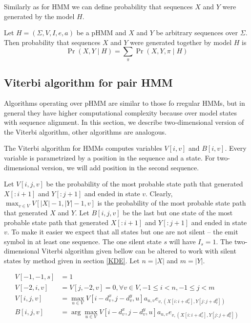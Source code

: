 Similarly as for HMM we can define probability that sequences $X$ and $Y$ were
generated by the model $H$.

\begin{definition}
Let $H=(\Sigma,V,I,e,a)$ be a pHMM and  $X$ and $Y$ be arbitrary sequences over
$\Sigma$. Then probability that sequences $X$ and $Y$ were generated together by
model $H$ is 
\begin{equation}
\Pr\left(X,Y\mid H\right)=\sum_{\pi}\Pr\left(X,Y,\pi\mid H\right)
\end{equation}
\end{definition}


\subsection{Viterbi algorithm for pair HMM}

Algorithms operating over  pHMM are similar to those fo rregular HMMs, but in
general they have higher computational complexity because over model states with
sequence alignment.
In this section, we describe two-dimensional version of the Viterbi algorithm,
other algorithms are analogous.

The Viterbi algorithm for HMMs computes variables $V[i,v]$ and $B[i,v]$. Every
variable is parametrized by a position in the sequence and a state. For
two-dimensional version, we will add position in the second sequence.

Let $V[i,j,v]$ be the probability of the most probable state path that generated
$X[:i+1]$ and $Y[:j+1]$ and ended in state $v$. Clearly, $\max_{v\in
V}V[|X|-1,|Y|-1,v]$ is the probability of the most probable state path that
generated $X$ and $Y$. Let $B[i,j,v]$ be the last but one state of the most
probable state path that generated $X[:i+1]$ and $Y[:j+1]$ and ended in state
$v$. To make it easier we expect that all states but one are not silent -- the emit
symbol in at least one sequence. The one silent state $s$ will have $I_s=1$.
The two-dimensional Viterbi algorithm given bellow can be altered to work with
silent states by method given in section \ref{KDE}. Let $n=|X|$ and $m=|Y|$.

\begin{align}
V[-1,-1,s] &= 1\\
V[-2,i,v] &= V[j,-2,v] = 0, \forall v\in V,-1 \leq i < n, -1\leq j < m\\
V[i,j,v] &= \max_{u\in
V}V[i-d^x_{v},j-d^y_v,u]a_{u,v}e_{v,(X[i:i+d^x_v],Y[j:j+d^y_v])}\label{EQUATION:2DVITERBIF}\\
B[i,j,v] &= \arg\max_{u\in
V}V[i-d^x_{v},j-d^y_v,u]a_{u,v}e_{v,(X[i:i+d^x_v],Y[j:j+d^y_v])}\label{EQUATION:2DVITERBIB}
\end{align}

